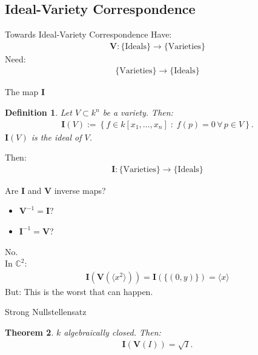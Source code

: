 \documentclass[notes=hide]{beamer}
\newtheorem{defn}{Definition}
\newtheorem{thm}[defn]{Theorem}
\newcommand{\C}{\mathbb{C}}
\newcommand{\V}{\mathbf{V}}
\newcommand{\I}{\mathbf{I}}
\newcommand{\mvar}[2]{#1_1,\ldots , #1_{#2}}
\newcommand{\kxn}{k[\mvar{x}{n}]}
\begin{document}
\subsection{Ideal-Variety Correspondence}
\begin{frame}{Towards Ideal-Variety Correspondence}
Have:
\begin{align*}
\V : \{\text{Ideals}\} \rightarrow \{\text{Varieties}\}
\end{align*}
\pause
Need:
\begin{align*}
\{\text{Varieties}\} \rightarrow \{\text{Ideals}\}
\end{align*}
\end{frame}
\begin{frame}{The map $\I$}
\begin{defn}
Let $V\subset k^n$ be a variety. Then: 
\begin{align*}
\I (V) := \left\lbrace f\in \kxn \; :\; f(p) =0 \,\forall \, p \in V  \right\rbrace .
\end{align*}
$\I (V)$ is \emph{the ideal of $V$}.
\end{defn}
\pause
Then:
\begin{align*}
\I : \{\text{Varieties}\} \rightarrow \{\text{Ideals}\}
\end{align*}
\end{frame}

\begin{frame}
Are $\I$ and $\V$ inverse maps?
\begin{itemize}
\item $\V^{-1} = \I$?
\item $\I^{-1} = \V$?
\end{itemize}\pause
No. \\
In $\C^2$:
\begin{align*}
\I (\V (\langle x^2 \rangle)) = \I ( \{ (0,y) \} ) = \langle x \rangle
\end{align*}\pause
But: This is the worst that can happen.
\end{frame}

\begin{frame}{Strong Nullstellensatz}
\begin{thm}
$k$ algebraically closed. Then:
\begin{align*}
\I(\V(I))=\sqrt{I} .
\end{align*}
\end{thm}
\end{frame}
\end{document}
